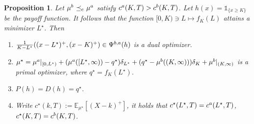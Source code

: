 \documentclass[10pt,a4paper]{amsart}
\newtheorem{proposition}{Proposition}
\newcommand{\E}{\mathbb{E}}
\DeclareMathOperator{\cleq}{\,\preceq_{\rm c}\,}
\begin{document}
\begin{proposition}\label{prop:digital-call-spread}
Let $\mu^{\rm b}\cleq \mu^{\rm a}$ satisfy $c^{\rm a}(K,T)>c^{\rm b}(K,T)$. Let $h(x) = \mathds{1}_{\{x\geq K\}}$ be the payoff function.
It follows that the function $[0,K)\ni L\mapsto f_K(L)$ attains a minimizer $L^\star$. Then
\begin{enumerate}[label = (\roman*)]
    \item $\frac{1}{K-L^\star}((x-L^\star)^+, (x-K)^+) \in \Psi^{\rm b,a}(h)$ is a dual optimizer.
\item $\mu^\star = \mu^{\rm a}|_{[0,L^\star)} + (\mu^{\rm a}([L^\star, \infty)) - q^\star) \delta_{L^\star} + (q^\star - \mu^{\rm b}((K, \infty)) ) \delta_{K} +  \mu^{\rm b}|_{(K,\infty)}$ is a primal optimizer, where $q^\star =  f_K(L^\star)$.
\item $P(h)=D(h)= q^\star$.
\item Write $c^\star(k,T):=\E_{\mu^\star}[(X-k)^+]$, it holds that $c^\star(L^\star,T)=c^{\rm a}(L^\star,T)$, $c^\star(K,T)=c^{\rm b}(K,T)$.
\end{enumerate}
\end{proposition}
\end{document}

